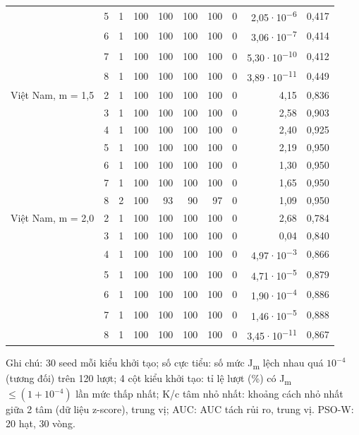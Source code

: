 \begin{table}[htbp]
\begin{tabular}{@{}lrrrrrrrrr@{}}
 & 5 & 1 & 100 & 100 & 100 & 100 & 0 & 2,05·10\textsuperscript{−6} & 0,417 \\
 & 6 & 1 & 100 & 100 & 100 & 100 & 0 & 3,06·10\textsuperscript{−7} & 0,414 \\
 & 7 & 1 & 100 & 100 & 100 & 100 & 0 & 5,30·10\textsuperscript{−10} & 0,412 \\
 & 8 & 1 & 100 & 100 & 100 & 100 & 0 & 3,89·10\textsuperscript{−11} & 0,449 \\
\midrule
Việt Nam, m = 1,5 & 2 & 1 & 100 & 100 & 100 & 100 & 0 & 4,15 & 0,836 \\
 & 3 & 1 & 100 & 100 & 100 & 100 & 0 & 2,58 & 0,903 \\
 & 4 & 1 & 100 & 100 & 100 & 100 & 0 & 2,40 & 0,925 \\
 & 5 & 1 & 100 & 100 & 100 & 100 & 0 & 2,19 & 0,950 \\
 & 6 & 1 & 100 & 100 & 100 & 100 & 0 & 1,30 & 0,950 \\
 & 7 & 1 & 100 & 100 & 100 & 100 & 0 & 1,65 & 0,950 \\
 & 8 & 2 & 100 & 93 & 90 & 97 & 0 & 1,09 & 0,950 \\
\midrule
Việt Nam, m = 2,0 & 2 & 1 & 100 & 100 & 100 & 100 & 0 & 2,68 & 0,784 \\
 & 3 & 1 & 100 & 100 & 100 & 100 & 0 & 0,04 & 0,840 \\
 & 4 & 1 & 100 & 100 & 100 & 100 & 0 & 4,97·10\textsuperscript{−3} & 0,866 \\
 & 5 & 1 & 100 & 100 & 100 & 100 & 0 & 4,71·10\textsuperscript{−5} & 0,879 \\
 & 6 & 1 & 100 & 100 & 100 & 100 & 0 & 1,90·10\textsuperscript{−4} & 0,886 \\
 & 7 & 1 & 100 & 100 & 100 & 100 & 0 & 1,46·10\textsuperscript{−5} & 0,888 \\
 & 8 & 1 & 100 & 100 & 100 & 100 & 0 & 3,45·10\textsuperscript{−11} & 0,867 \\
\bottomrule
\end{tabular}
\par\smallskip\parbox{\linewidth}{\scriptsize Ghi chú: 30 seed mỗi kiểu khởi tạo; số cực tiểu: số mức J\textsubscript{m} lệch nhau quá $10^{-4}$ (tương đối) trên 120 lượt; 4 cột kiểu khởi tạo: tỉ lệ lượt (\%) có J\textsubscript{m} $\le (1 + 10^{-4})$ lần mức thấp nhất; K/c tâm nhỏ nhất: khoảng cách nhỏ nhất giữa 2 tâm (dữ liệu z-score), trung vị; AUC: AUC tách rủi ro, trung vị. PSO-W: 20 hạt, 30 vòng.}
\end{table}
